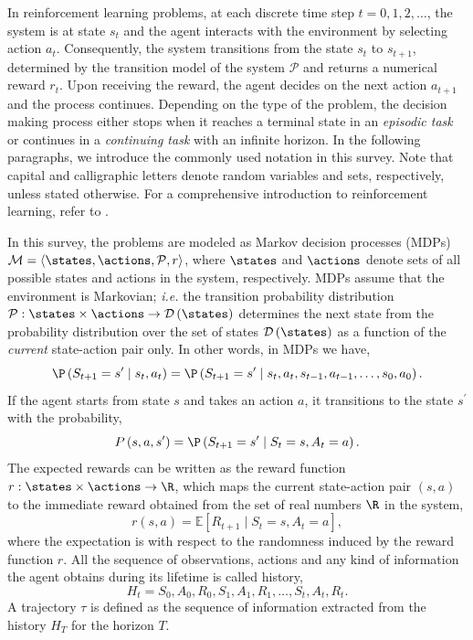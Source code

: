 In reinforcement learning problems, at each discrete time step $t=0,1,2,\dots$, the system is at state $s_t$ and the agent interacts with the environment by selecting action $a_t$. Consequently, the system transitions from the state $s_t$ to $s_{t+1}$, determined by the transition model of the system $\mathcal{P}$ and returns a numerical reward $r_t$. Upon receiving the reward, the agent decides on the next action $a_{t+1}$ and the process continues. Depending on the type of the problem, the decision making process either stops when it reaches a terminal state in an \textit{episodic task} or continues in a \textit{continuing task} with an infinite horizon. In the following paragraphs, we introduce the commonly used notation in this survey. Note that capital and calligraphic letters denote random variables and sets, respectively, unless stated otherwise. For a comprehensive introduction to reinforcement learning, refer to .

In this survey, the problems are modeled as Markov decision processes (MDPs) $\mathcal{M}=\langle\states, \actions, \mathcal{P}, r\rangle$, where $\states$ and $\actions$ denote sets of all possible states and actions in the system, respectively. MDPs assume that the environment is Markovian; \emph{i.e.} the transition probability distribution $\mathcal{P}:\states\times\actions\rightarrow\mathcal{D}\left(\states\right)$ determines the next state from the probability distribution over the set of states $\mathcal{D}\left(\states\right)$ as a function of the \emph{current} state-action pair only. In other words, in MDPs we have,
\begin{equation}
    \P\left(S_{t+1}=s^\prime\mid s_t,a_t\right)=\P\left(S_{t+1} = s^\prime\mid s_t,a_t,s_{t-1},a_{t-1},\dots,s_0,a_0\right).
\end{equation}
If the agent starts from state $s$ and takes an action $a$, it transitions to the state $s^\prime$ with the probability,
\begin{equation}
    P\left(s,a,s^\prime\right) =\P\left(S_{t+1}=s^\prime\mid S_t=s,A_t=a\right).\label{eq:transitionProbability}
\end{equation}
The expected rewards can be written as the reward function $r:\states\times\actions\rightarrow\R$, which maps the current state-action pair $(s,a)$ to the immediate reward obtained from the set of real numbers $\R$ in the system,
\begin{equation}
    r\left(s,a\right)=\mathbb{E}\left[R_{t+1}\mid S_t=s,A_t=a \right],\label{eq:rewardFunction}
\end{equation}
where the expectation is with respect to the randomness induced by the reward function $r$.
All the sequence of observations, actions and any kind of information the agent obtains during its lifetime is called history,
\begin{equation}
    H_t=S_0,A_0,R_0,S_1,A_1,R_1,\dots,S_t,A_t,R_t.
\end{equation}
A trajectory $\tau$ is defined as the sequence of information extracted from the history $H_T$ for the horizon $T$.

